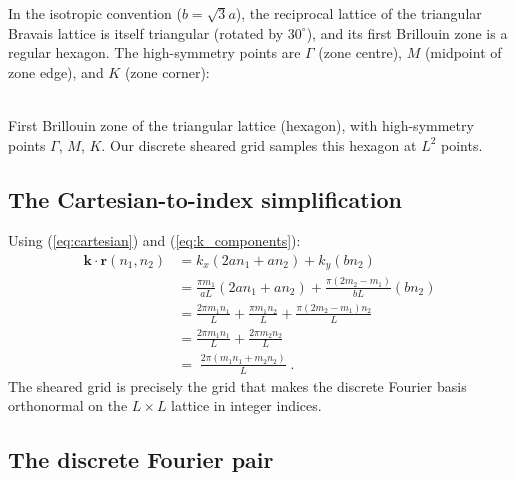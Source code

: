 \documentclass[11pt,a4paper]{article}
\newcommand{\nn}{\nonumber \\}
\newcommand{\vk}{\mathbf{k}}
\newcommand{\vr}{\mathbf{r}}
\begin{document}
In the isotropic convention ($b = \sqrt{3} a$), the reciprocal lattice
of the triangular Bravais lattice is itself triangular (rotated by
$30^\circ$), and its first Brillouin zone is a regular hexagon. The
high-symmetry points are $\Gamma$ (zone centre), $M$ (midpoint of zone
edge), and $K$ (zone corner):
\begin{center}
\\[1mm]
{\footnotesize First Brillouin zone of the triangular lattice (hexagon),
with high-symmetry points $\Gamma$, $M$, $K$. Our discrete sheared grid
samples this hexagon at $L^2$ points.}
\end{center}

\subsection{The Cartesian-to-index simplification}\label{ssec:cart_simplify}

Using (\ref{eq:cartesian}) and (\ref{eq:k_components}):
\begin{align}
\vk \cdot \vr(n_1, n_2)
&= k_x(2 a n_1 + a n_2) + k_y(b n_2) \nn
&= \frac{\pi m_1}{a L}(2 a n_1 + a n_2) + \frac{\pi(2 m_2 - m_1)}{b L}(b n_2) \nn
&= \frac{2\pi m_1 n_1}{L} + \frac{\pi m_1 n_2}{L} + \frac{\pi(2 m_2 - m_1) n_2}{L} \nn
&= \frac{2\pi m_1 n_1}{L} + \frac{2\pi m_2 n_2}{L} \nn
&= \boxed{\;\frac{2\pi(m_1 n_1 + m_2 n_2)}{L}\;}.
\label{eq:k_dot_r_clean}
\end{align}
The sheared grid is precisely the grid that makes the discrete Fourier
basis orthonormal on the $L \times L$ lattice in integer indices.

\subsection{The discrete Fourier pair}\label{ssec:dft}
\end{document}
